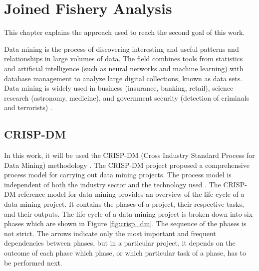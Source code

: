 % 
%  
%
\chapter{Joined Fishery Analysis}
\label{cha:server}
This chapter explains the approach used to reach the second goal of this work. 


Data mining is the process of discovering interesting and useful patterns and relationships in large volumes of data. The field combines tools from statistics and artificial intelligence (such as neural networks and machine learning) with database management to analyze large digital collections, known as data sets. Data mining is widely used in business (insurance, banking, retail), science research (astronomy, medicine), and government security (detection of criminals and terrorists) \cite{Okonkwo2011COMBATINGCA}. 

\section{CRISP-DM} %
\label{sub:crisp_dm}

In this work, it will be used the CRISP-DM (Cross Industry Standard Process for Data Mining) methodology \cite{CRISPDM}.
The CRISP-DM project proposed a comprehensive process model for carrying out data mining projects. The process model is independent of both the industry sector and the technology used \cite{CRISPDM}. 
The CRISP-DM reference model for data mining provides an overview of the life cycle of a data
mining project. It contains the phases of a project, their respective tasks, and their outputs.
The life cycle of a data mining project is broken down into six phases which are shown in Figure \ref{fig:crisp_dm}.
The sequence of the phases is not strict. The arrows indicate only the most important and frequent
dependencies between phases, but in a particular project, it depends on the outcome of each phase
which phase, or which particular task of a phase, has to be performed next.

